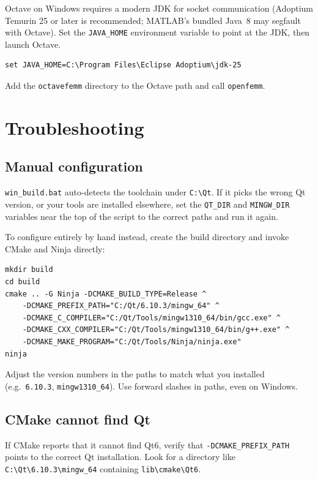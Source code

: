 \documentclass[11pt]{article}
\begin{document}
Octave on Windows requires a modern JDK for socket communication
(Adoptium Temurin 25 or later is recommended; MATLAB's bundled Java~8
may segfault with Octave).  Set the \texttt{JAVA\_HOME} environment
variable to point at the JDK, then launch Octave.

\begin{lstlisting}
set JAVA_HOME=C:\Program Files\Eclipse Adoptium\jdk-25
\end{lstlisting}

Add the \texttt{octavefemm} directory to the Octave path and call
\texttt{openfemm}.

\section{Troubleshooting}

\subsection{Manual configuration}

\texttt{win\_build.bat} auto-detects the toolchain under
\texttt{C:\textbackslash Qt}.  If it picks the wrong Qt version, or your
tools are installed elsewhere, set the \texttt{QT\_DIR} and
\texttt{MINGW\_DIR} variables near the top of the script to the correct
paths and run it again.

To configure entirely by hand instead, create the build directory and
invoke CMake and Ninja directly:
\begin{lstlisting}
mkdir build
cd build
cmake .. -G Ninja -DCMAKE_BUILD_TYPE=Release ^
    -DCMAKE_PREFIX_PATH="C:/Qt/6.10.3/mingw_64" ^
    -DCMAKE_C_COMPILER="C:/Qt/Tools/mingw1310_64/bin/gcc.exe" ^
    -DCMAKE_CXX_COMPILER="C:/Qt/Tools/mingw1310_64/bin/g++.exe" ^
    -DCMAKE_MAKE_PROGRAM="C:/Qt/Tools/Ninja/ninja.exe"
ninja
\end{lstlisting}
Adjust the version numbers in the paths to match what you installed
(e.g.\ \texttt{6.10.3}, \texttt{mingw1310\_64}).  Use forward slashes in
paths, even on Windows.

\subsection{CMake cannot find Qt}

If CMake reports that it cannot find Qt6, verify that
\texttt{-DCMAKE\_PREFIX\_PATH} points to the correct Qt installation.
Look for a directory like \texttt{C:\textbackslash Qt\textbackslash 6.10.3\textbackslash mingw\_64}
containing \texttt{lib\textbackslash cmake\textbackslash Qt6}.
\end{document}
